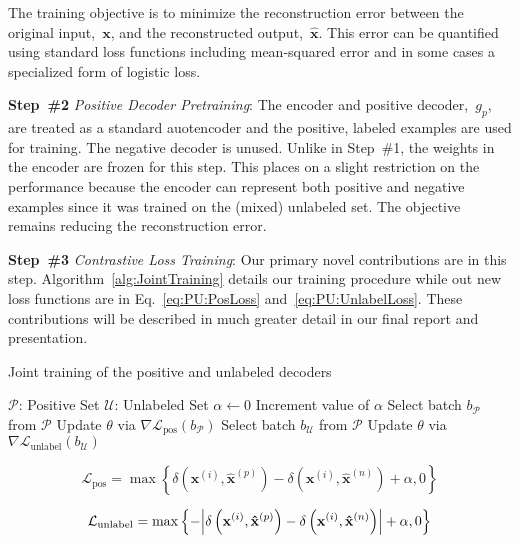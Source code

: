 \documentclass[10pt]{article}
\DeclarePairedDelimiter{\abs}{\lvert}{\rvert}
\newcommand{\xI}[1]{\mathbf{x}^{(#1)}}
\newcommand{\xPred}[1]{\mathbf{\hat{x}}^{\left(#1\right)}}
\newcommand{\xP}{\xPred{p}}
\newcommand{\xN}{\xPred{n}}
\newcommand{\puDist}[2]{\delta\left(#1, #2\right)}
\newcommand{\puDistDiff}{\puDist{\xI{i}}{\xP} - \puDist{\xI{i}}{\xN}}
\newcommand{\pLoss}{\mathcal{L}_{\text{pos}}}
\newcommand{\uLoss}{\mathcal{L}_{\text{unlabel}}}
\begin{document}
The training objective is to minimize the reconstruction error between the original input,~$\mathbf{x}$, and the reconstructed output,~$\hat{\mathbf{x}}$. This error can be quantified using standard loss functions including mean-squared error and in some cases a specialized form of logistic loss.

\vspace{6pt}
\noindent
\textbf{Step~\#2} \textit{Positive Decoder Pretraining}: The encoder and positive decoder,~$g_p$, are treated as a standard auotencoder and the positive, labeled examples are used for training.  The negative decoder is unused.  Unlike in Step~\#1, the weights in the encoder are frozen for this step.  This places on a slight restriction on the performance because the encoder can represent both positive and negative examples since it was trained on the (mixed) unlabeled set.  The objective remains reducing the reconstruction error.

\vspace{6pt}
\noindent
\textbf{Step~\#3} \textit{Contrastive Loss Training}: Our primary novel contributions are in this step.  Algorithm~\ref{alg:JointTraining} details our training procedure while out new loss functions are in Eq.~\eqref{eq:PU:PosLoss} and~\ref{eq:PU:UnlabelLoss}.  These contributions will be described in much greater detail in our final report and presentation.

\begin{algorithm}[t]
  \caption{Joint training of the positive and unlabeled decoders}\label{alg:JointTraining}
  \begin{algorithmic}[1]
    \State $\mathcal{P}$: Positive Set
    \State $\mathcal{U}$: Unlabeled Set
    \State $\alpha\gets 0$
      \State Increment value of $\alpha$
        \State Select batch $b_{\mathcal{P}}$ from $\mathcal{P}$
        \State Update $\theta$ via $\nabla\pLoss(b_{\mathcal{P}})$
        \State Select batch $b_{\mathcal{U}}$ from $\mathcal{P}$
        \State Update $\theta$ via $\nabla\uLoss(b_{\mathcal{U}})$
      \EndWhile
    \EndWhile
  \end{algorithmic}
\end{algorithm}

  \begin{equation}\label{eq:PU:PosLoss}
    \pLoss = \max\left\{ \puDistDiff + \alpha, 0 \right\}
  \end{equation}

  \begin{equation}\label{eq:PU:UnlabelLoss}
    \uLoss = \max\left\{ - \abs*{\puDistDiff} + \alpha, 0 \right\}
  \end{equation}
\end{document}
